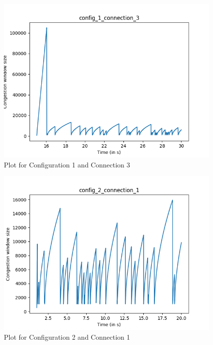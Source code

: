 \documentclass{article}
\begin{document}
\begin{figure}[H]
    \centering
    \includegraphics[scale = 0.8]{Q3/outputs/plots/config_1_connection_3.png}
    \caption{Plot for Configuration 1 and Connection 3}
\end{figure}

\begin{figure}[H]
    \centering
    \includegraphics[scale = 0.8]{Q3/outputs/plots/config_2_connection_1.png}
    \caption{Plot for Configuration 2 and Connection 1}
\end{figure}
\end{document}
